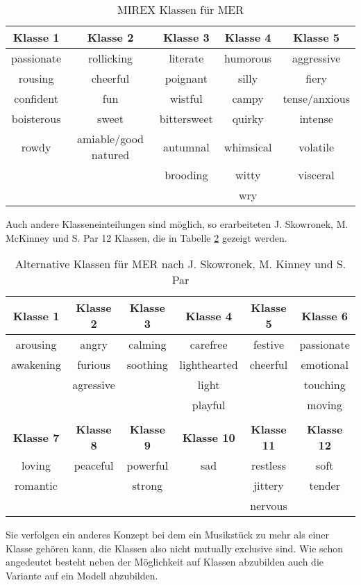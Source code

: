 \documentclass[11pt,a4paper]{article}
\begin{document}
\begin{table}[!ht]
\begin{tabular}{c c c c c}
\textbf{Klasse 1} & \textbf{Klasse 2} & \textbf{Klasse 3} & \textbf{Klasse 4} & \textbf{Klasse 5} \\
\hline
passionate & rollicking & literate & humorous & aggressive \\
rousing & cheerful & poignant & silly & fiery \\
confident & fun & wistful & campy & tense/anxious \\
boisterous & sweet & bittersweet & quirky & intense \\
rowdy & amiable/good natured & autumnal & whimsical & volatile \\
 & & brooding & witty & visceral \\
  & & & wry &
\end{tabular}
\caption[MIREX Music Emotion Recognition Klassen]{MIREX Klassen für MER}
\label{tab:MIREXclasses}
\end{table}
\noindent
Auch andere Klasseneinteilungen sind möglich, so erarbeiteten J. Skowronek, M. McKinney und S. Par  \cite{7cd5f337a4b030e3fafd0b4bc7e0976ff7cc1ec8c28d583c5dab695e0ee78941} 12 Klassen, die in Tabelle \ref{tab:altclasses} gezeigt werden.\\

\begin{table}[!ht]
\begin{tabular}{c c c c c c}
\textbf{Klasse 1} & \textbf{Klasse 2} & \textbf{Klasse 3} & \textbf{Klasse 4} & \textbf{Klasse 5} & \textbf{Klasse 6} \\
\hline
arousing  & angry     & calming  & carefree     & festive  & passionate \\
awakening & furious   & soothing & lighthearted & cheerful & emotional \\
          & agressive &          & light        &          & touching    \\
          &           &          & playful      &          & moving      \\
\vspace{10pt}\\
\textbf{Klasse 7} & \textbf{Klasse 8} & \textbf{Klasse 9} & \textbf{Klasse 10} & \textbf{Klasse 11} & \textbf{Klasse 12}\\
\hline
loving   & peaceful & powerful & sad & restless & soft\\
romantic &          & strong   &     & jittery  & tender\\
         &          &          &     & nervous  & \\
\end{tabular}
\caption[Alternative Music Emotion Recognition Klassen]{Alternative Klassen für MER nach J. Skowronek, M. Kinney und S. Par \cite{7cd5f337a4b030e3fafd0b4bc7e0976ff7cc1ec8c28d583c5dab695e0ee78941}}
\label{tab:altclasses}
\end{table}
\noindent
Sie verfolgen ein anderes Konzept bei dem ein Musikstück zu mehr als einer Klasse gehören kann, die Klassen also nicht mutually exclusive sind. Wie schon angedeutet besteht neben der Möglichkeit auf Klassen abzubilden auch die Variante auf ein Modell abzubilden. 
\end{document}
